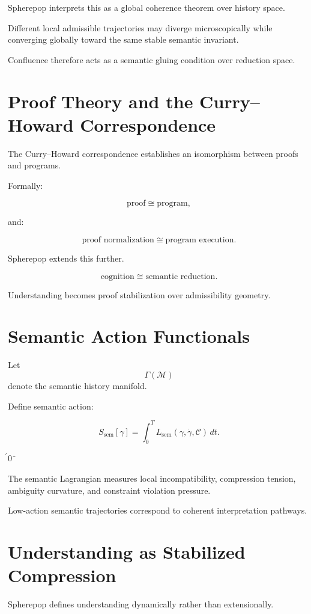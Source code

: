 \documentclass[12pt,openany]{book}
\theoremstyle{plain}
\theoremstyle{definition}
\theoremstyle{remark}
\begin{document}
Spherepop interprets this as a global coherence theorem over
history space.

Different local admissible trajectories may diverge
microscopically while converging globally toward the same stable
semantic invariant.

Confluence therefore acts as a semantic gluing condition over
reduction space.

\section{Proof Theory and the Curry--Howard Correspondence}

The Curry--Howard correspondence establishes an isomorphism
between proofs and programs.

Formally:

\[
\text{proof}
\cong
\text{program},
\]

and:

\[
\text{proof normalization}
\cong
\text{program execution}.
\]

Spherepop extends this further.

\[
\text{cognition}
\cong
\text{semantic reduction}.
\]

Understanding becomes proof stabilization over admissibility
geometry.

\section{Semantic Action Functionals}

Let
\[
\Gamma(\mathcal{M})
\]
denote the semantic history manifold.

Define semantic action:

\[
S_{\mathrm{sem}}[\gamma]
=
\int_0^T
L_{\mathrm{sem}}
(\gamma,\dot\gamma,\mathcal{C})
\,dt.
\]

0

The semantic Lagrangian measures local incompatibility,
compression tension, ambiguity curvature, and constraint
violation pressure.

Low-action semantic trajectories correspond to coherent
interpretation pathways.

\section{Understanding as Stabilized Compression}

Spherepop defines understanding dynamically rather than
extensionally.
\end{document}
